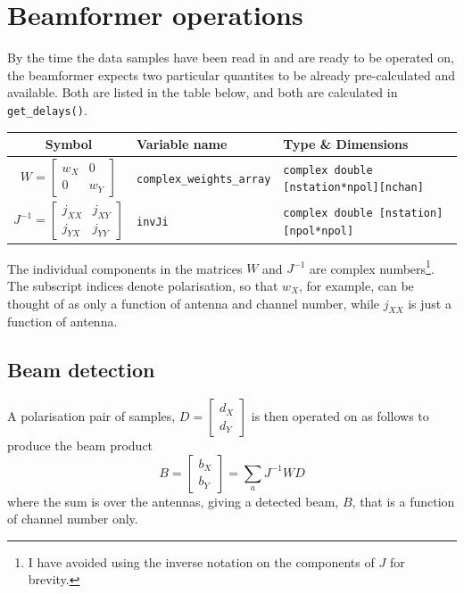 \documentclass{article}
\begin{document}
\section{Beamformer operations}

By the time the data samples have been read in and are ready to be operated on, the beamformer expects two particular quantites to be already pre-calculated and available.
Both are listed in the table below, and both are calculated in \texttt{get\_delays()}.
\begin{table}[!h]
    \centering
    \begin{tabular}{c|l|l}
        Symbol & Variable name & Type \& Dimensions \\[5pt]
        \hline
        $W = \begin{bmatrix} w_X & 0 \\ 0 & w_Y \end{bmatrix}$ & \texttt{complex\_weights\_array} & \texttt{complex double [nstation*npol][nchan]} \\[12pt]
        $J^{-1} = \begin{bmatrix} j_{XX} & j_{XY} \\ j_{YX} & j_{YY} \end{bmatrix}$ & \texttt{invJi} & \texttt{complex double [nstation][npol*npol]}
    \end{tabular}
\end{table}
The individual components in the matrices $W$ and $J^{-1}$ are complex numbers\footnote{I have avoided using the inverse notation on the components of $J$ for brevity.}. The subscript indices denote polarisation, so that $w_X$, for example, can be thought of as only a function of antenna and channel number, while $j_{XX}$ is just a function of antenna.

\subsection{Beam detection}
A polarisation pair of samples, $D = \begin{bmatrix} d_X \\ d_Y \end{bmatrix}$ is then operated on as follows to produce the beam product
\begin{equation}
    B = \begin{bmatrix} b_X \\ b_Y \end{bmatrix} = \sum_a J^{-1}WD
\end{equation}
where the sum is over the antennas, giving a detected beam, $B$, that is a function of channel number only.
\end{document}
